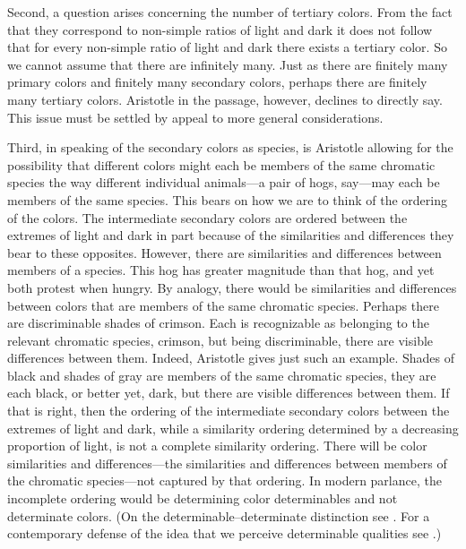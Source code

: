 Second, a question arises concerning the number of tertiary colors. From the fact that they correspond to non-simple ratios of light and dark it does not follow that for every non-simple ratio of light and dark there exists a tertiary color. So we cannot assume that there are infinitely many. Just as there are finitely many primary colors and finitely many secondary colors, perhaps there are finitely many tertiary colors. Aristotle in the passage, however, declines to directly say. This issue must be settled by appeal to more general considerations.

Third, in speaking of the secondary colors as species, is Aristotle allowing for the possibility that different colors might each be members of the same chromatic species the way different individual animals---a pair of hogs, say---may each be members of the same species. This bears on how we are to think of the ordering of the colors. The intermediate secondary colors are ordered between the extremes of light and dark in part because of the similarities and differences they bear to these opposites. However, there are similarities and differences between members of a species. This hog has greater magnitude than that hog, and yet both protest when hungry. By analogy, there would be similarities and differences between colors that are members of the same chromatic species. Perhaps there are discriminable shades of crimson. Each is recognizable as belonging to the relevant chromatic species, crimson, but being discriminable, there are visible differences between them. Indeed, Aristotle gives just such an example. Shades of black and shades of gray are members of the same chromatic species, they are each black, or better yet, dark, but there are visible differences between them.  If that is right, then the ordering of the intermediate secondary colors between the extremes of light and dark, while a similarity ordering determined by a decreasing proportion of light, is not a complete similarity ordering. There will be color similarities and differences---the similarities and differences between members of the chromatic species---not captured by that ordering. In modern parlance, the incomplete ordering would be determining color determinables and not determinate colors. (On the determinable--determinate distinction see \citealt{Johnson:1921fk}. For a contemporary defense of the idea that we perceive determinable qualities see \citealt{Allen:2010ak,Hilbert:1987jq,Stazicker:2011an}.)

